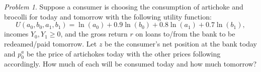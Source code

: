 \documentclass[12pt]{article}
\theoremstyle{definition}
\theoremstyle{remark}
\newtheorem{prob}{Problem}[section]
\begin{document}
\maketitle
%
%
\section{}
\begin{prob}
  Suppose a consumer is choosing the consumption of artichoke and brocolli for today and tomorrow with the following utility function:
  $$U(a_0, b_0, a_1, b_1) = \ln(a_0) + 0.9 \ln(b_0) + 0.8 \ln(a_1) + 0.7 \ln(b_1), $$
  incomes $Y_0, Y_1 \geq 0$, and the gross return $r$ on loans to/from the bank to be redeamed/paid tomorrow. Let $z$ be the consumer's net position at the bank today and $p_0^a$ be the price of artichokes today with the other prices following accordingly. How much of each will be consumed today and how much tomorrow?
\end{prob}
\end{document}
